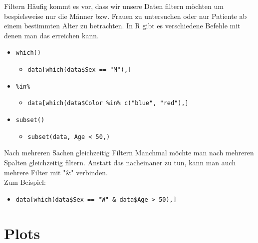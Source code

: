 \documentclass[xcolor=dvipsnames, aspectratio = 169]{beamer}
\begin{document}
\begin{frame}[fragile]{Filtern}
Häufig kommt es vor, dass wir unsere Daten filtern möchten um bespielsweise nur die Männer bzw. Frauen zu untersuchen oder nur Patiente ab einem bestimmten Alter zu betrachten. In R gibt es verschiedene Befehle mit denen man das erreichen kann.
	\begin{itemize}
		\item  \verb+which()+
		\begin{itemize}
			\item  \verb+data[which(data$Sex == "M"),]+
		\end{itemize}
		\item  \verb+%in%+
		\begin{itemize}
			\item  \verb+data[which(data$Color %in% c("blue", "red"),]+
		\end{itemize}
		\item  \verb+subset()+
		\begin{itemize}
			\item  \verb+subset(data, Age < 50,)+
		\end{itemize}
	\end{itemize}
\end{frame}

\begin{frame}[fragile]{Nach mehreren Sachen gleichzeitig Filtern}
Manchmal möchte man nach mehreren Spalten gleichzeitig filtern. Anstatt das nacheinaner zu tun, kann man auch mehrere Filter mit "\&" verbinden. \\
Zum Beispiel:
	\begin{itemize}
		\item  \verb+data[which(data$Sex == "W" & data$Age > 50),]+
	\end{itemize}
\end{frame}


\section{Plots}
\end{document}
